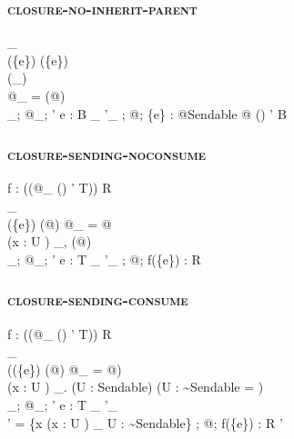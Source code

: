 \subsubsection{\textsc{closure-no-inherit-parent}}

  {\Gamma_{} \subseteq \Gamma \\
   \neg\inheritActorContext(\{e\}) \land \neg\isPassedToSendingParameter(\{e\}) \\
   \isAllSendable(\Gamma_{}) \\
   @\kappa_{} = \toCapability(@\iota) \\
   \Gamma_{};\; @\kappa_{};\; \alpha' \vdash e : B \at \rho_{} \dashv \Gamma'_{}}
  {\Gamma;\; @\kappa;\; \alpha \vdash \{e\} : @\textsf{Sendable}\; @\iota\; ()\; \alpha' \to B \at \mathunderscore \dashv \Gamma}

\subsubsection{\textsc{closure-sending-noconsume}}

  {f : (\sending(@\kappa_{}\; ()\; \alpha' \to T)) \to R \\
   \Gamma_{} \subseteq \Gamma \\
   \inheritActorContext(\{e\}) \land \isActorIsolated(@\kappa) \land @\kappa_{} = @\kappa \\
   \forall (x : U \at \rho) \in \Gamma_{},\; \rho \in \Capturable(@\kappa) \\
   \Gamma_{};\; @\kappa_{};\; \alpha' \vdash e : T \at \rho_{} \dashv \Gamma'_{}}
  {\Gamma;\; @\kappa;\; \alpha \vdash f(\{e\}) : R \at \mathunderscore \dashv \Gamma}

\subsubsection{\textsc{closure-sending-consume}}

  {f : (\sending(@\kappa_{}\; ()\; \alpha' \to T)) \to R \\
   \Gamma_{} \subseteq \Gamma \\
   \neg(\inheritActorContext(\{e\}) \land \isActorIsolated(@\kappa) \land @\kappa_{} = @\kappa) \\
   \forall (x : U \at \rho) \in \Gamma_{}.\; (U : \textsf{Sendable}) \lor (U : {\sim}\textsf{Sendable} \land \rho = \disconnected) \\
   \Gamma_{};\; @\kappa_{};\; \alpha' \vdash e : T \at \rho_{} \dashv \Gamma'_{} \\
   \Gamma' = \Gamma \setminus \{x \mid (x : U \at \disconnected) \in \Gamma_{} \land U : {\sim}\textsf{Sendable}\}}
  {\Gamma;\; @\kappa;\; \alpha \vdash f(\{e\}) : R \at \mathunderscore \dashv \Gamma'}


